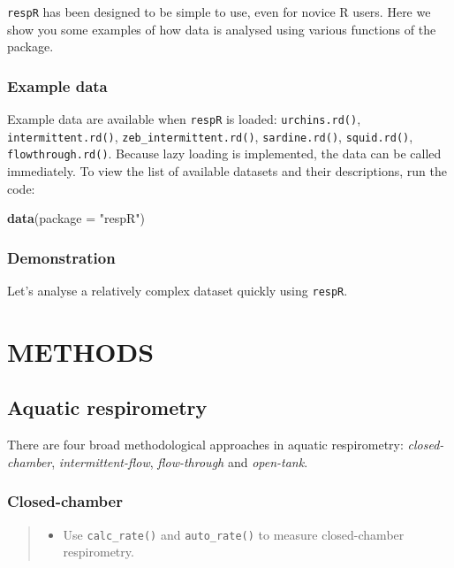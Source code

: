 \documentclass[]{book}
\newenvironment{Shaded}{\begin{snugshade}}{\end{snugshade}}
\newcommand{\KeywordTok}[1]{\textcolor[rgb]{0.13,0.29,0.53}{\textbf{#1}}}
\newcommand{\DataTypeTok}[1]{\textcolor[rgb]{0.13,0.29,0.53}{#1}}
\newcommand{\StringTok}[1]{\textcolor[rgb]{0.31,0.60,0.02}{#1}}
\newcommand{\NormalTok}[1]{#1}
\providecommand{\tightlist}{%
  \setlength{\itemsep}{0pt}\setlength{\parskip}{0pt}}
\begin{document}
\texttt{respR} has been designed to be simple to use, even for novice R
users. Here we show you some examples of how data is analysed using
various functions of the package.

\section{Example data}\label{example-data}

Example data are available when \texttt{respR} is loaded:
\texttt{urchins.rd()}, \texttt{intermittent.rd()},
\texttt{zeb\_intermittent.rd()}, \texttt{sardine.rd()},
\texttt{squid.rd()}, \texttt{flowthrough.rd()}. Because lazy loading is
implemented, the data can be called immediately. To view the list of
available datasets and their descriptions, run the code:

\begin{Shaded}
\begin{Highlighting}[]
\KeywordTok{data}\NormalTok{(}\DataTypeTok{package =} \StringTok{"respR"}\NormalTok{)}
\end{Highlighting}
\end{Shaded}

\section{Demonstration}\label{demonstration}

Let's analyse a relatively complex dataset quickly using \texttt{respR}.

\part*{METHODS}\label{part-methods}

\chapter{Aquatic respirometry}\label{aquatic-respirometry}

There are four broad methodological approaches in aquatic respirometry:
\emph{closed-chamber}, \emph{intermittent-flow}, \emph{flow-through} and
\emph{open-tank}.

\section{Closed-chamber}\label{closed-chamber}

\begin{quote}
\begin{itemize}
\tightlist
\item
  Use \texttt{calc\_rate()} and \texttt{auto\_rate()} to measure
  closed-chamber respirometry.
\end{itemize}
\end{quote}
\end{document}
